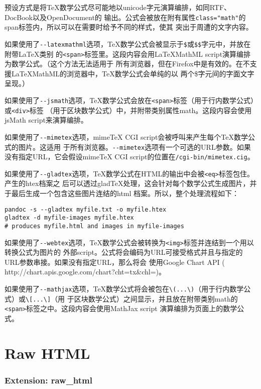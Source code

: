 \documentclass[fancyhdr,bookmark]{ctexbook}
\begin{document}
预设方式是将TeX数学公式尽可能地以unicode字元演算编排，如同RTF、DocBook以及OpenDocument的
输出。公式会被放在附有属性\lstinline!class="math"!的span标签内，所以可以在需要时给予不同的样式，使其
突出于周遭的文字内容。

如果使用了\lstinline!--latexmathml!选项，TeX数学公式会被显示于\lstinline!$!或\lstinline!$$!字元中，并放在附带LaTeX类别
的\lstinline!<span>!标签里。这段内容会用LaTeXMathML
script演算编排为数学公式。（这个方法无法适用于
所有浏览器，但在Firefox中是有效的。在不支援LaTeXMathML的浏览器中，TeX数学公式会单纯的以
两个\$字元间的字面文字呈现。）

如果使用了\lstinline!--jsmath!选项，TeX数学公式会放在\lstinline!<span>!标签（用于行内数学公式）或\lstinline!<div>!标签
（用于区块数学公式）中，并附带类别属性math。这段内容会使用jsMath
script来演算编排。

如果使用了\lstinline!--mimetex!选项，mimeTeX CGI
script会被呼叫来产生每个TeX数学公式的图片。这适用
于所有浏览器。\lstinline!--mimetex!选项有一个可选的URL参数。如果没有指定URL，它会假设mimeTeX
CGI script的位置在\lstinline!/cgi-bin/mimetex.cig!。

如果使用了\lstinline!--gladtex!选项，TeX数学公式在HTML的输出中会被\lstinline!<eq>!标签包住。产生的htex档案之
后可以透过gladTeX处理，这会针对每个数学公式生成图片，并于最后生成一个包含这些图片连结的html
档案。所以，整个处理流程如下：

\begin{lstlisting}
pandoc -s --gladtex myfile.txt -o myfile.htex
gladtex -d myfile-images myfile.htex
# produces myfile.html and images in myfile-images
\end{lstlisting}

如果使用了\lstinline!--webtex!选项，TeX数学公式会被转换为\lstinline!<img>!标签并连结到一个用以转换公式为图片的
外部script。公式将会编码为URL可接受格式并且与指定的URL参数串接。如果没有指定URL，那么将会
使用Google Chart API (
http://chart.apis.google.com/chart?cht=tx\&chl=)。

如果使用了\lstinline!--mathjax!选项，TeX数学公式将会被包在\lstinline!\(...\)!（用于行内数学公式）或\lstinline!\[...\]!（用
于区块数学公式）之间显示，并且放在附带类别math的\lstinline!<span>!标签之中。这段内容会使用MathJax
script 演算编排为页面上的数学公式。

\section{Raw HTML}\label{raw-html}

\subsubsection{Extension: raw\_html}\label{extension-rawux5fhtml}
\end{document}
